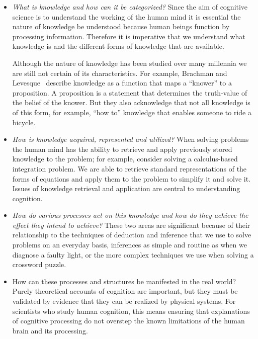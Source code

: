 \begin{itemize}
\item \emph{What is knowledge and how can it be categorized?}  Since the aim
  of cognitive science is to understand the working of the human mind
  it is essential the nature of knowledge be understood because human
  beings function by processing information. Therefore it is
  imperative that we understand what knowledge is and the different
  forms of knowledge that are available.

  Although the nature of knowledge has been studied over many
  millennia we are still not certain of its characteristics.  For
  example, Brachman and Levesque~\cite{brachman-levesque:2004a}
  describe knowledge as a function that maps a ``knower'' to a
  proposition. A proposition is a statement that determines the truth-value of the belief of the knower. But they also acknowledge that
  not all knowledge is of this form, for example, ``how to'' knowledge
  that enables someone to ride a bicycle.

\item \emph{How is knowledge acquired, represented and utilized?} When
  solving problems the human mind has the ability to retrieve and
  apply previously stored knowledge to the problem; for example,
  consider solving a calculus-based integration problem.  We are able
  to retrieve standard representations of the forms of equations and
  apply them to the problem to simplify it and solve it.  Issues of
  knowledge retrieval and application are central to understanding
  cognition.

\item {\em How do various processes act on this knowledge and how do
    they achieve the effect they intend to achieve?}  These two areas
  are significant because of their relationship to the techniques of
  deduction and inference that we use to solve problems on an everyday
  basis, inferences as simple and routine as when we diagnose a faulty
  light, or the more complex techniques we use when solving a
  crossword puzzle.

\item How can these processes and structures be manifested in the real
  world?  Purely theoretical accounts of cognition are important, but
  they must be validated by evidence that they can be realized by
  physical systems.  For scientists who study human cognition, this
  means ensuring that explanations of cognitive processing do not
  overstep the known limitations of the human brain and its
  processing.
\end{itemize}

